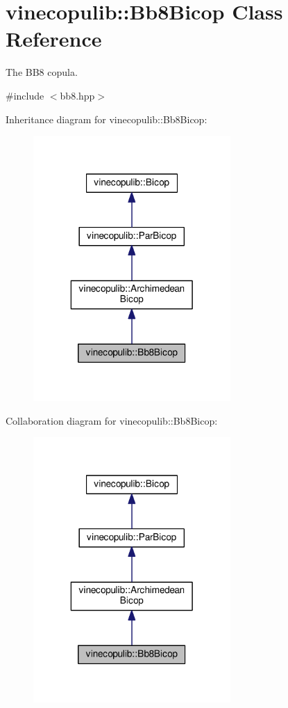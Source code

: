\hypertarget{classvinecopulib_1_1_bb8_bicop}{}\section{vinecopulib\+:\+:Bb8\+Bicop Class Reference}
\label{classvinecopulib_1_1_bb8_bicop}


The B\+B8 copula.  




{\ttfamily \#include $<$bb8.\+hpp$>$}



Inheritance diagram for vinecopulib\+:\+:Bb8\+Bicop\+:\nopagebreak
\begin{figure}[H]
\begin{center}
\leavevmode
\includegraphics[width=213pt]{classvinecopulib_1_1_bb8_bicop__inherit__graph}
\end{center}
\end{figure}


Collaboration diagram for vinecopulib\+:\+:Bb8\+Bicop\+:\nopagebreak
\begin{figure}[H]
\begin{center}
\leavevmode
\includegraphics[width=213pt]{classvinecopulib_1_1_bb8_bicop__coll__graph}
\end{center}
\end{figure}
